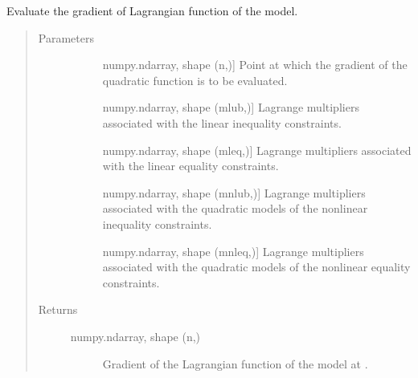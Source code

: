 \documentclass[letterpaper,10pt,english]{sphinxmanual}
\begin{document}
\begin{fulllineitems}
\begin{fulllineitems}
\label{\detokenize{refs/generated/cobyqa.optimize.Models.lag_grad:cobyqa.optimize.Models.lag_grad}}
\sphinxAtStartPar
Evaluate the gradient of Lagrangian function of the model.
\begin{quote}\begin{description}
\item[{Parameters}] \leavevmode\begin{description}
\item[{}] \leavevmode{[}numpy.ndarray, shape (n,){]}
\sphinxAtStartPar
Point at which the gradient of the quadratic function is to be
evaluated.

\item[{}] \leavevmode{[}numpy.ndarray, shape (mlub,){]}
\sphinxAtStartPar
Lagrange multipliers associated with the linear inequality
constraints.

\item[{}] \leavevmode{[}numpy.ndarray, shape (mleq,){]}
\sphinxAtStartPar
Lagrange multipliers associated with the linear equality
constraints.

\item[{}] \leavevmode{[}numpy.ndarray, shape (mnlub,){]}
\sphinxAtStartPar
Lagrange multipliers associated with the quadratic models of the
nonlinear inequality constraints.

\item[{}] \leavevmode{[}numpy.ndarray, shape (mnleq,){]}
\sphinxAtStartPar
Lagrange multipliers associated with the quadratic models of the
nonlinear equality constraints.

\end{description}

\item[{Returns}] \leavevmode\begin{description}
\item[{numpy.ndarray, shape (n,)}] \leavevmode
\sphinxAtStartPar
Gradient of the Lagrangian function of the model at .

\end{description}

\end{description}\end{quote}


\end{fulllineitems}
\end{fulllineitems}
\end{document}
